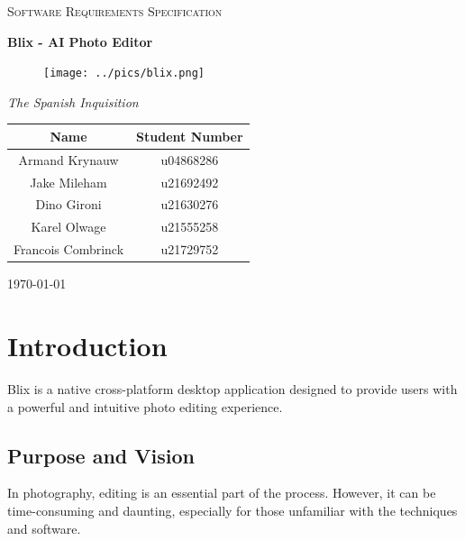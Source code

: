 \documentclass[11pt,a4paper]{article}
\begin{document}
\begin{titlepage}
	\centering
    {\scshape\LARGE Software Requirements Specification\par}
    \vspace{1.5cm}
    {\huge\bfseries Blix - AI Photo Editor\par}
    \begin{figure}[h]
        \centering %
        \texttt{[image: ../pics/blix.png]}
    \end{figure}
    \vspace{2.5cm}
    {\Large\itshape The Spanish Inquisition\par}
	\begin{tabular}{|c|c|}
		\hline
		\textbf{Name} 		& \textbf{Student Number} \\
		\hline
		Armand Krynauw		& u04868286  \\
		Jake Mileham		& u21692492  \\
		Dino Gironi			& u21630276  \\
		Karel Olwage		& u21555258  \\
		Francois Combrinck	& u21729752  \\
		\hline
	\end{tabular}
    \vfill
    {\large \today\par}
\end{titlepage}

\tableofcontents
\pagebreak


\section*{Introduction}

Blix is a native cross-platform desktop application designed to provide users
with a powerful and intuitive photo editing experience.

\subsection*{Purpose and Vision}

In photography, editing is an essential part of the process. However, it can be
time-consuming and daunting, especially for those unfamiliar with the techniques
and software. 
\end{document}
